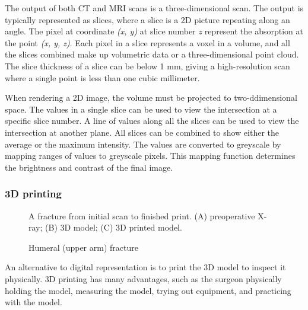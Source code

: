\documentclass[a4paper]{report}
\begin{document}
The output of both CT and MRI scans is a three-dimensional scan. The output is typically represented as slices, where a slice is a 2D picture repeating along an angle. The pixel at coordinate \emph{(x, y)} at slice number \emph{z} represent the absorption at the point \emph{(x, y, z)}\cite{chougule_conversions_2013}.
Each pixel in a slice represents a voxel in a volume, and all the slices combined make up volumetric data or a three-dimensional point cloud\cite{chougule_conversions_2013}.
The slice thickness of a slice can be below 1 mm, giving a high-resolution scan where a single point is less than one cubic millimeter\cite{hamblen_outline_2010}.

When rendering a 2D image, the volume must be projected to two-ddimensional space. The values in a single slice can be used to view the intersection at a specific slice number. A line of values along all the slices can be used to view the intersection at another plane.
All slices can be combined to show either the average or the maximum intensity\cite{fishman_volume_2006}.
The values are converted to greyscale by mapping ranges of values to greyscale pixels. This mapping function determines the brightness and contrast of the final image.

\subsubsection{ 3D printing }

\begin{figure}[h!]
    \centering
	\hfill
  \caption{Humeral (upper arm) fracture}
  \small
    A fracture from initial scan to finished print. (A) preoperative X-ray; (B) 3D model; (C) 3D printed model.
~\cite{mishra_virtual_2019}
\end{figure}

An alternative to digital representation is to print the 3D model to inspect it physically\cite{mishra_virtual_2019}. 3D printing has many advantages, such as the surgeon physically holding the model, measuring the model, trying out equipment, and practicing with the model.
\end{document}
